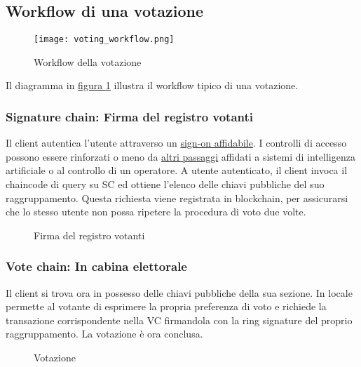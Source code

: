 	\subsection{Workflow di una votazione}
		\begin{figure}[ht]
			\centering
			\texttt{[image: voting\_workflow.png]}
			\caption{Workflow della votazione}
			\label{fig:voting_workflow}
		\end{figure}
		Il diagramma in \hyperref[fig:voting_workflow]{figura \ref*{fig:voting_workflow}} illustra il workflow tipico di una votazione.
		\subsubsection{Signature chain: Firma del registro votanti}
			Il client autentica l'utente attraverso un \hyperref[subsec:personalita_voto]{sign-on affidabile}. I controlli di accesso possono essere rinforzati o meno da \hyperref[subsec:liberta_voto]{altri passaggi} affidati a sistemi di intelligenza artificiale o al controllo di un operatore. A utente autenticato, il client invoca il chaincode di query su SC ed ottiene l'elenco delle chiavi pubbliche del suo raggruppamento. Questa richiesta viene registrata in blockchain, per assicurarsi che lo stesso utente non possa ripetere la procedura di voto due volte.
			\begin{figure}[ht]
				\centering
				\hspace{5mm}
				\caption{Firma del registro votanti}
				\label{fig:firma_voto}
			\end{figure}
			
		\subsubsection{Vote chain: In cabina elettorale}
			Il client si trova ora in possesso delle chiavi pubbliche della sua sezione. In locale permette al votante di esprimere la propria preferenza di voto e richiede la transazione corrispondente nella VC firmandola con la ring signature del proprio raggruppamento.
			La votazione è ora conclusa.
			\begin{figure}[ht]
				\centering
				\hspace{5mm}
				\caption{Votazione}
				\label{fig:votazione}
			\end{figure}
			

